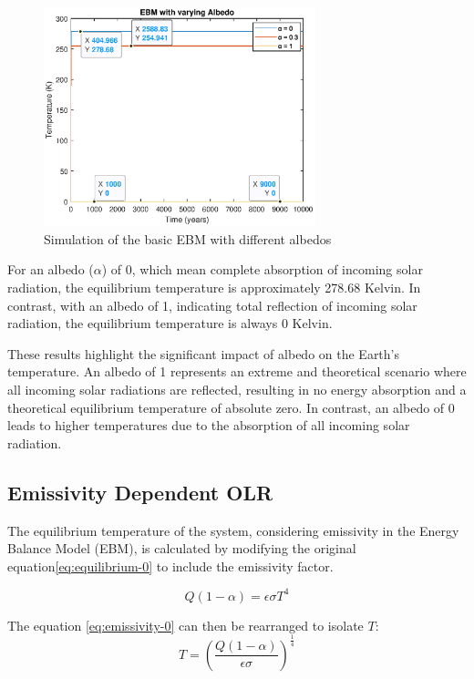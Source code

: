 \documentclass[12pt]{article}
\begin{document}
\begin{figure}[H]
    \centering
    \includegraphics[width=0.7\textwidth]{images/albedo_extremes.eps}
    \caption{Simulation of the basic EBM with different albedos}
    \label{fig:albedo_extremes}
\end{figure}

For an albedo ($\alpha$) of 0, which mean complete absorption of incoming solar radiation, the equilibrium temperature is approximately 278.68 Kelvin. In contrast, with an albedo of 1, indicating total reflection of incoming solar radiation, the equilibrium temperature is always 0 Kelvin. 

These results highlight the significant impact of albedo on the Earth's temperature. An albedo of 1 represents an extreme and theoretical scenario where all incoming solar radiations are reflected, resulting in no energy absorption and a theoretical equilibrium temperature of absolute zero. In contrast, an albedo of 0 leads to higher temperatures due to the absorption of all incoming solar radiation.

\subsection{Emissivity Dependent OLR} \label{section:olr-emissivity}
The equilibrium temperature of the system, considering emissivity in the Energy Balance Model (EBM), is calculated by modifying the original equation\ref{eq:equilibrium-0} to include the emissivity factor\cite{kaper-2013-math-ac-emissivity}.

\begin{equation} \label{eq:emissivity-0}
    Q(1 - \alpha) = \epsilon\sigma T^4
\end{equation}

\noindent The equation \ref{eq:emissivity-0} can then be rearranged to isolate $T$:
\begin{equation} \label{eq:emissivity-1}
    T = \left( \frac{Q(1 - \alpha)}{\epsilon\sigma} \right)^{\frac{1}{4}}
\end{equation}
\end{document}

